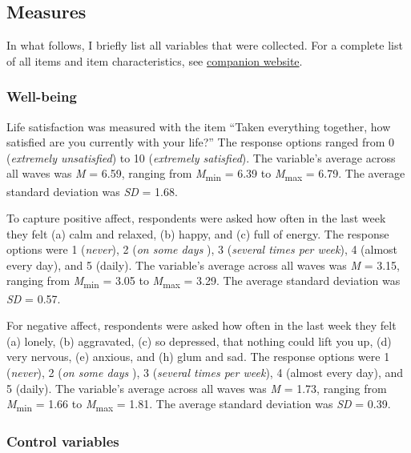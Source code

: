 \documentclass[
  english,
  man,floatsintext]{apa6}
\begin{document}
\hypertarget{measures}{%
\subsection{Measures}\label{measures}}

In what follows, I briefly list all variables that were collected.
For a complete list of all items and item characteristics, see \href{xxx}{companion website}.

\hypertarget{well-being}{%
\subsubsection{Well-being}\label{well-being}}

Life satisfaction was measured with the item ``Taken everything together, how satisfied are you currently with your life?''
The response options ranged from 0 (\emph{extremely unsatisfied}) to 10 (\emph{extremely satisfied}).
The variable's average across all waves was \emph{M} = 6.59, ranging from \emph{M}\textsubscript{min} = 6.39 to \emph{M}\textsubscript{max} = 6.79.
The average standard deviation was \emph{SD} = 1.68.

To capture positive affect, respondents were asked how often in the last week they felt (a) calm and relaxed, (b) happy, and (c) full of energy.
The response options were 1 (\emph{never}), 2 (\emph{on some days} ), 3 (\emph{several times per week}), 4 (almost every day), and 5 (daily).
The variable's average across all waves was \emph{M} = 3.15, ranging from \emph{M}\textsubscript{min} = 3.05 to \emph{M}\textsubscript{max} = 3.29.
The average standard deviation was \emph{SD} = 0.57.

For negative affect, respondents were asked how often in the last week they felt (a) lonely, (b) aggravated, (c) so depressed, that nothing could lift you up, (d) very nervous, (e) anxious, and (h) glum and sad.
The response options were 1 (\emph{never}), 2 (\emph{on some days} ), 3 (\emph{several times per week}), 4 (almost every day), and 5 (daily).
The variable's average across all waves was \emph{M} = 1.73, ranging from \emph{M}\textsubscript{min} = 1.66 to \emph{M}\textsubscript{max} = 1.81.
The average standard deviation was \emph{SD} = 0.39.

\hypertarget{control-variables}{%
\subsubsection{Control variables}\label{control-variables}}
\end{document}
